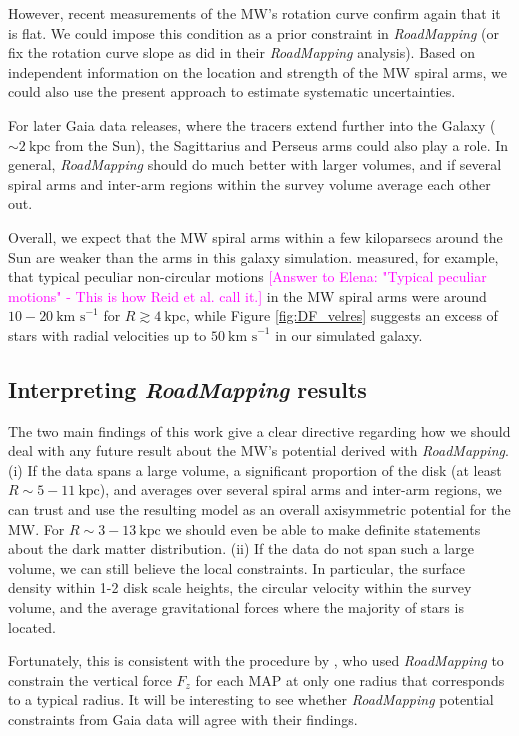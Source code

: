 \documentclass[iop,revtex4,numberedappendix,appendixfloats]{emulateapj}
\newcommand{\RM}{{\sl RoadMapping}}
\newcommand{\Wilma}[1]{\textcolor{Magenta}{#1}}
\begin{document}
However, recent measurements of the MW's rotation curve \citep{2012ApJ...759..131B,2014ApJ...783..130R} confirm again that it is flat. We could impose this condition as a prior constraint in \RM{} (or fix the rotation curve slope as \citet{2013ApJ...779..115B} did in their \RM{} analysis). Based on independent information on the location and strength of the MW spiral arms, we could also use the present approach to estimate systematic uncertainties.

For later Gaia data releases, where the tracers extend further into the Galaxy ($\sim2~\text{kpc}$ from the Sun), the Sagittarius and Perseus arms could also play a role. In general, \RM{} should do much better with larger volumes, and if several spiral arms and inter-arm regions within the survey volume average each other out.

Overall, we expect that the MW spiral arms within a few kiloparsecs around the Sun are weaker than the arms in this galaxy simulation. \citet{2014ApJ...783..130R} measured, for example, that typical peculiar non-circular motions \Wilma{[Answer to Elena: "Typical peculiar motions" - This is how Reid et al.  call it.]} in the MW spiral arms were around $10-20~\text{km s}^{-1}$ for $R \gtrsim 4~\text{kpc}$, while Figure \ref{fig:DF_velres} suggests an excess of stars with radial velocities up to $50~\text{km s}^{-1}$ in our simulated galaxy.

\subsection{Interpreting \RM{} results}

The two main findings of this work give a clear directive regarding how we should deal with any future result about the MW's potential derived with \RM{}. (i) If the data spans a large volume, a significant proportion of the disk (at least $R\sim 5-11~\text{kpc}$), and averages over several spiral arms and inter-arm regions, we can trust and use the resulting model as an overall axisymmetric potential for the MW. For $R\sim 3-13~\text{kpc}$ we should even be able to make definite statements about the dark matter distribution. (ii) If the data do not span such a large volume, we can still believe the local constraints. In particular, the surface density within 1-2 disk scale heights, the circular velocity within the survey volume, and the average gravitational forces where the majority of stars is located.

Fortunately, this is consistent with the procedure by \citet{2013ApJ...779..115B}, who used \RM{} to constrain the vertical force $F_z$ for each MAP at only one radius that corresponds to a typical radius. It will be interesting to see whether \RM{} potential constraints from Gaia data will agree with their findings.
\end{document}
